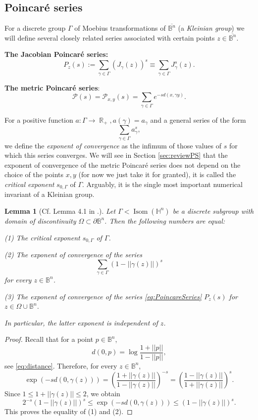 \documentclass[12pt]{amsbook}%
\newtheorem{lem}[thm]{Lemma}
\theoremstyle{definition}
\theoremstyle{remark}
\numberwithin{section}{chapter}
\numberwithin{subsection}{section}
\numberwithin{figure}{chapter}
\DeclareMathOperator{\Isom}{Isom}
\DeclareMathOperator{\R}{\mathbb{R}}
\def\bB{{\mathbb{B}}}
\def\bH{{\mathbb{H}}}
\def\cP{{\mathscr{P}}}
\def\Ga{\Gamma}
\def\ga{\gamma}
\def\ol{\overline}
\begin{document}
{{\subsection{Poincar\'e series}\label{sec:Poincare1}


For a discrete group $\Ga$ of Moebius transformations of $\ol{\mathbb B^n}$ (a {\em Kleinian group}) we will define several closely related series associated with certain points $z\in \ol{\mathbb B^n}$. 

\medskip
{\bf The Jacobian Poincar\'e series:}  
\begin{equation}\label{eq:PoincareSeries} 
P_z(s):=\sum_{\ga\in \Ga} (J_\ga(z))^s\equiv \sum_{\ga\in \Ga} J^s_\ga(z). 
\end{equation}

{\bf The metric  Poincar\'e series}: \index{Poincar\'e series $\cP(s)$}
\begin{equation}\label{eq:Poincare0}
\cP(s) = \cP_{x,y}(s)=\sum_{\ga \in \Ga} e^{-s d(x, \gamma y)}.
\end{equation}

For a positive function $a: \Ga\to \R_+, a(\ga)=a_\ga$ and a general series of the form
$$
\sum_{\ga\in \Ga} a_\ga^s, 
$$
we define the {\em exponent of convergence} as the infimum of those values of $s$ for which this series converges. We will see 
in Section \ref{sec:reviewPS} that the exponent of convergence of the metric Poincar\'e series does not depend on the choice of the 
points $x, y$ (for now we just take it for granted), %
it is called the {\em critical exponent} $s_{0,\Ga}$ of $\Ga$. Arguably, it is the single most important numerical invariant of a Kleinian group. 


\begin{lem}
[Cf. Lemma 4.1 in \cite{FMS}.] \label{lem:2CE}
Let $\Ga< \Isom(\bH^n)$ be a discrete subgroup with domain of discontinuity $\Omega\subset \partial \mathbb B^n$. 
Then the following numbers are equal:

(1) The critical exponent $s_{0,\Ga}$ of $\Ga$. 

(2) The exponent of convergence of the series
$$
\sum_{\ga\in \Ga} (1-||\ga(z)||)^s  
$$
for every $z\in \bB^n$. 

(3) The exponent of convergence of the series \eqref{eq:PoincareSeries} $P_z(s)$ for $z\in \Omega \cup \mathbb B^n$. 

In particular, the latter exponent is independent of $z$. 
\end{lem}
\begin{proof} Recall  that for a point $p\in \mathbb B^n$,   
$$
d(0, p)= \log \frac{1+||p||}{1-||p||},
$$
see \eqref{eq:distance}. Therefore, for every $z\in \mathbb B^n$, 
$$
\exp(-s d(0, \gamma(z)))= \left(\frac{1+||\gamma(z)||}{1-||\gamma(z)||} \right)^{-s}= \left(\frac{1-||\gamma(z)||}{1+||\gamma(z)||} \right)^{s}. 
$$
Since $1\le 1+||\gamma(z)||\leqslant 2$, we obtain
$$
2^{-s} (1-||\gamma(z)||)^s \leqslant \exp(-s d(0, \gamma(z))) \leqslant  (1-||\gamma(z)||)^s. 
$$
This proves the equality of (1) and (2). 


\end{proof}}}
\end{document}
